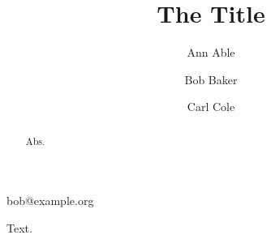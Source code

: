 \documentclass{beilstein}
\begin{document}
\title{The Title}
\author{Ann Able}
\author*[1]{Bob Baker}{bob@example.org}
\author{Carl Cole}
\maketitle
\begin{abstract}
Abs.
\end{abstract}
Text.
\end{document}
